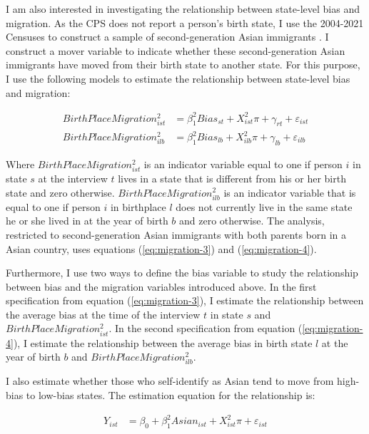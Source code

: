 I am also interested in investigating the relationship between state-level bias and migration. As the CPS does not report a person's birth state, I use the 2004-2021 Censuses to construct a sample of second-generation Asian immigrants \autocite{floodsarahIntegratedPublicUse2021}. I construct a mover variable to indicate whether these second-generation Asian immigrants have moved from their birth state to another state. For this purpose, I use the following models to estimate the relationship between state-level bias and migration:

\begin{align}
BirthPlaceMigration_{ist}^2 &= \beta_1^2 Bias_{st} 
                   + X_{ist}^2\pi + \gamma_{rt} 
                   + \varepsilon_{ist} \label{eq:migration-3} \\
BirthPlaceMigration_{ilb}^2 &= \beta_1^2 Bias_{lb} 
                   + X_{ilb}^2\pi + \gamma_{lb} 
                   + \varepsilon_{ilb} \label{eq:migration-4}
\end{align}

Where $BirthPlaceMigration_{ist}^2$ is an indicator variable equal to one if person $i$ in state $s$ at the interview $t$ lives in a state that is different from his or her birth state and zero otherwise. $BirthPlaceMigration_{ilb}^2$ is an indicator variable that is equal to one if person $i$ in birthplace $l$ does not currently live in the same state he or she lived in at the year of birth $b$ and zero otherwise. The analysis, restricted to second-generation Asian immigrants with both parents born in a Asian country, uses equations (\ref{eq:migration-3}) and (\ref{eq:migration-4}). 

Furthermore, I use two ways to define the bias variable to study the relationship between bias and the migration variables introduced above. In the first specification from equation (\ref{eq:migration-3}), I estimate the relationship between the average bias at the time of the interview $t$ in state $s$ and $BirthPlaceMigration_{ist}^2$. In the second specification from equation (\ref{eq:migration-4}), I estimate the relationship between the average bias in birth state $l$ at the year of birth $b$ and $BirthPlaceMigration_{ilb}^2$.

I also estimate whether those who self-identify as Asian tend to move from high-bias to low-bias states. The estimation equation for the relationship is: 

\begin{align}
Y_{ist} &= \beta_0 + \beta_1^2 Asian_{ist} +
                   X_{ist}^2\pi
                   + \varepsilon_{ist} \label{eq:migration-5}
\end{align}

